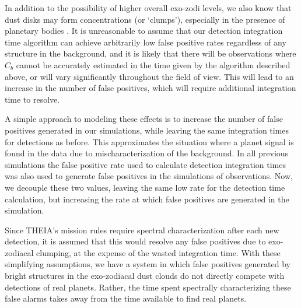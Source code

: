 In addition to the possibility of higher overall exo-zodi levels, we also know that dust disks may form concentrations (or `clumps'),  especially in the presence of planetary bodies \citep{stark2008detectability}.  It is unreasonable to assume that our detection integration time algorithm can achieve arbitrarily low false positive rates regardless of any structure in the background, and it is likely that there will be observations where $C_b$ cannot be accurately estimated in the time given by the algorithm described above, or will vary significantly throughout the field of view.  This will lead to an increase in the number of false positives, which will require additional integration time to resolve.

A simple approach to modeling these effects is to increase the number of false positives generated in our simulations, while leaving the same integration times for detections as before.  This approximates the situation where a planet signal is found in the data due to mischaracterization of the background.  In all previous simulations the false positive rate used to calculate detection integration times was also used to generate false positives in the simulations of observations. Now, we decouple these two values, leaving the same low rate for the detection time calculation, but increasing the rate at which false positives are generated in the simulation.

Since THEIA's mission rules require spectral characterization after each new detection, it is assumed that this would resolve any false positives due to exo-zodiacal clumping, at the expense of the wasted integration time. With these simplifying assumptions, we have a system in which false positives generated by bright structures in the exo-zodiacal dust clouds do not directly compete with detections of real planets.  Rather, the time spent spectrally characterizing these false alarms takes away from the time available to find real planets.

